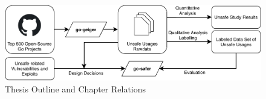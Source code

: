 \begin{figure}[ht]
    \includegraphics[width=\textwidth]{assets/figures/chapter1/outline1.pdf}
    \caption{Thesis Outline and Chapter Relations}
    \label{fig:outline}
\end{figure}
